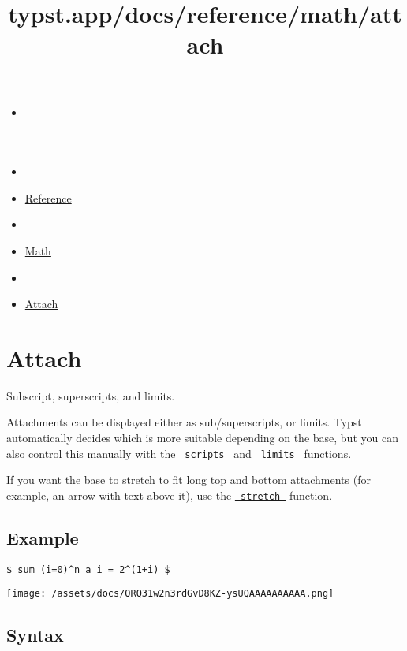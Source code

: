 \title{typst.app/docs/reference/math/attach}

\begin{itemize}
\tightlist
\item
  \href{/docs}{}
\item
  
\item
  \href{/docs/reference/}{Reference}
\item
  
\item
  \href{/docs/reference/math/}{Math}
\item
  
\item
  \href{/docs/reference/math/attach}{Attach}
\end{itemize}

\section{Attach}\label{summary}

Subscript, superscripts, and limits.

Attachments can be displayed either as sub/superscripts, or limits.
Typst automatically decides which is more suitable depending on the
base, but you can also control this manually with the
\texttt{\ scripts\ } and \texttt{\ limits\ } functions.

If you want the base to stretch to fit long top and bottom attachments
(for example, an arrow with text above it), use the
\href{/docs/reference/math/stretch/}{\texttt{\ stretch\ }} function.

\subsection{Example}\label{example}

\begin{verbatim}
$ sum_(i=0)^n a_i = 2^(1+i) $
\end{verbatim}

\texttt{[image: /assets/docs/QRQ31w2n3rdGvD8KZ-ysUQAAAAAAAAAA.png]}

\subsection{Syntax}\label{syntax}

